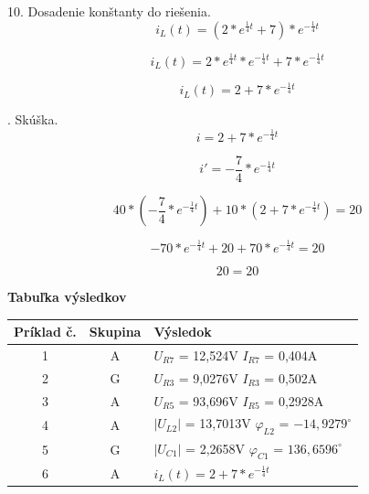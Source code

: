 \documentclass[a4paper,12pt]{article}
\begin{document}
10. Dosadenie konštanty do riešenia.
\begin{equation}
i_L(t) = (2*e^{\frac{1}{4} t} + 7)*e^{-\frac{1}{4} t}
\end{equation}

\begin{equation}
i_L(t) = 2*e^{\frac{1}{4} t} * e^{-\frac{1}{4} t}  + 7 * e^{-\frac{1}{4} t}
\end{equation}

\begin{equation}
i_L(t) = 2 + 7 * e^{-\frac{1}{4} t}
\end{equation}

. Skúška.
\begin{equation}
i =  2 + 7 * e^{-\frac{1}{4} t}
\end{equation}

\begin{equation}
i' =  -\frac{7}{4} * e^{-\frac{1}{4} t}
\end{equation}

\begin{equation}
40*(-\frac{7}{4} * e^{-\frac{1}{4} t} ) + 10*(2 + 7 * e^{-\frac{1}{4} t} ) = 20
\end{equation}

\begin{equation}
-70 * e^{-\frac{1}{4} t} + 20 + 70 * e^{-\frac{1}{4} t}  = 20
\end{equation}

\begin{equation}
20 = 20
\end{equation}
\newpage
\begin{center}
\textbf{Tabuľka výsledkov}
\end{center}

\begin{center}
\begin{tabular}{|c|c|l|}
\hline
Príklad č.  & Skupina & Výsledok                            \\ \hline
1 & A & $U_{R7}$ = 12,524V  \hspace{7mm} $I_{R7}$ = 0,404A \\ \hline
2 & G & $U_{R3}$ = 9,0276V \hspace{7mm}  $I_{R3}$ = 0,502A \\ \hline
3 & A & $U_{R5}$ = 93,696V \hspace{7mm} $I_{R5}$ = 0,2928A \\ \hline
4 & A & $|U_{L2}|$ = 13,7013V  \hspace{3mm} $\varphi_{L2}$ = $ -14,9279^{\circ}$  \\ \hline
5 & G & $|U_{C1}|$ = 2,2658V  \hspace{5mm} $\varphi_{C1}$ = $136,6596^{\circ}$         \\ \hline
6 & A & $i_L(t) = 2 + 7 * e^{-\frac{1}{4} t} $                                  \\ \hline
\end{tabular}
\end{center}
\end{document}
